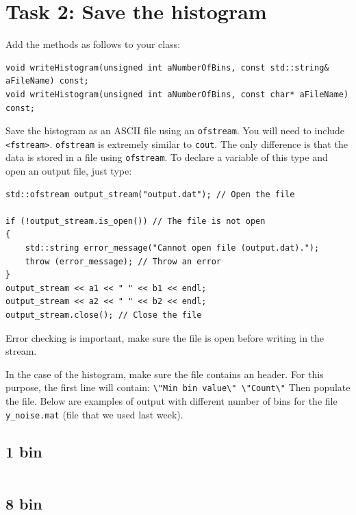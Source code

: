 \documentclass[english,a4paper,12pt,oneside]{article}
\begin{document}
\section*{Task 2: Save the histogram}

Add the methods as follows to your class:\\

\begin{lstlisting}
void writeHistogram(unsigned int aNumberOfBins, const std::string& aFileName) const;
void writeHistogram(unsigned int aNumberOfBins, const char* aFileName) const;
\end{lstlisting}


Save the histogram as an ASCII file using an \verb+ofstream+. You will need to include \verb+<fstream>+.
\verb+ofstream+ is extremely similar to \verb+cout+. 
The only difference is that the data is stored in a file using \verb+ofstream+. 
To declare a variable of this type and open an output file, just type:
\begin{lstlisting}
std::ofstream output_stream("output.dat"); // Open the file

if (!output_stream.is_open()) // The file is not open
{
	std::string error_message("Cannot open file (output.dat).");
	throw (error_message); // Throw an error
}
output_stream << a1 << " " << b1 << endl;
output_stream << a2 << " " << b2 << endl;
output_stream.close(); // Close the file
\end{lstlisting}
Error checking is important, make sure the file is open before writing in the stream. 

In the case of the histogram, make sure the file contains an header. 
For this purpose, the first line will contain:
\verb+\"Min bin value\" \"Count\"+
Then populate the file. 
Below are examples of output with different number of bins for the file \verb+y_noise.mat+ (file that we used last week).

\subsection*{1 bin}
\begin{center}
\begin{tabular}{cc}

\end{tabular}
\end{center}

\subsection*{8 bin}
\begin{center}
\begin{tabular}{cc}

\end{tabular}
\end{center}
\end{document}
